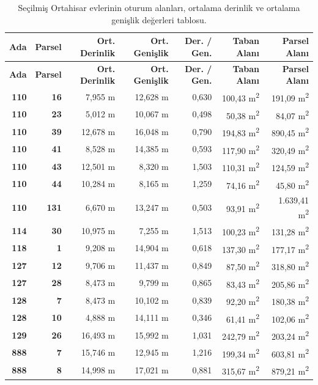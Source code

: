 \documentclass[12pt,turkish,a4paperpaper,]{report}
\begin{document}
\begin{longtable}[]{@{}rrrrrrr@{}}
\caption{Seçilmiş Ortahisar evlerinin oturum alanları, ortalama derinlik
ve ortalama genişlik değerleri tablosu.
\label{EvlerAlanlarOrtalamalar}}\tabularnewline
\toprule
\textbf{Ada} & \textbf{Parsel} & \textbf{Ort. Derinlik} & \textbf{Ort.
Genişlik} & \textbf{Der. / Gen.} & \textbf{Taban Alanı} & \textbf{Parsel
Alanı}\tabularnewline
\midrule
\endfirsthead
\toprule
\textbf{Ada} & \textbf{Parsel} & \textbf{Ort. Derinlik} & \textbf{Ort.
Genişlik} & \textbf{Der. / Gen.} & \textbf{Taban Alanı} & \textbf{Parsel
Alanı}\tabularnewline
\midrule
\endhead
\textbf{110} & \textbf{16} & 7,955 m & 12,628 m & 0,630 & 100,43
m\textsuperscript{2} & 191,09 m\textsuperscript{2}\tabularnewline
\textbf{110} & \textbf{23} & 5,012 m & 10,067 m & 0,498 & 50,38
m\textsuperscript{2} & 84,07 m\textsuperscript{2}\tabularnewline
\textbf{110} & \textbf{39} & 12,678 m & 16,048 m & 0,790 & 194,83
m\textsuperscript{2} & 890,45 m\textsuperscript{2}\tabularnewline
\textbf{110} & \textbf{41} & 8,528 m & 14,385 m & 0,593 & 117,90
m\textsuperscript{2} & 320,49 m\textsuperscript{2}\tabularnewline
\textbf{110} & \textbf{43} & 12,501 m & 8,320 m & 1,503 & 110,31
m\textsuperscript{2} & 124,59 m\textsuperscript{2}\tabularnewline
\textbf{110} & \textbf{44} & 10,284 m & 8,165 m & 1,259 & 74,16
m\textsuperscript{2} & 45,80 m\textsuperscript{2}\tabularnewline
\textbf{110} & \textbf{131} & 6,670 m & 13,247 m & 0,503 & 93,91
m\textsuperscript{2} & 1.639,41 m\textsuperscript{2}\tabularnewline
\textbf{114} & \textbf{30} & 10,975 m & 7,255 m & 1,513 & 100,23
m\textsuperscript{2} & 131,28 m\textsuperscript{2}\tabularnewline
\textbf{118} & \textbf{1} & 9,208 m & 14,904 m & 0,618 & 137,30
m\textsuperscript{2} & 177,17 m\textsuperscript{2}\tabularnewline
\textbf{127} & \textbf{12} & 9,706 m & 11,437 m & 0,849 & 87,50
m\textsuperscript{2} & 318,80 m\textsuperscript{2}\tabularnewline
\textbf{127} & \textbf{28} & 8,473 m & 9,799 m & 0,865 & 83,43
m\textsuperscript{2} & 205,86 m\textsuperscript{2}\tabularnewline
\textbf{128} & \textbf{7} & 8,473 m & 10,102 m & 0,839 & 92,20
m\textsuperscript{2} & 180,38 m\textsuperscript{2}\tabularnewline
\textbf{128} & \textbf{10} & 4,888 m & 14,111 m & 0,346 & 61,41
m\textsuperscript{2} & 102,06 m\textsuperscript{2}\tabularnewline
\textbf{129} & \textbf{26} & 16,493 m & 15,992 m & 1,031 & 242,79
m\textsuperscript{2} & 203,24 m\textsuperscript{2}\tabularnewline
\textbf{888} & \textbf{7} & 15,746 m & 12,945 m & 1,216 & 199,34
m\textsuperscript{2} & 603,81 m\textsuperscript{2}\tabularnewline
\textbf{888} & \textbf{8} & 14,998 m & 17,021 m & 0,881 & 315,67
m\textsuperscript{2} & 879,21 m\textsuperscript{2}\tabularnewline
\bottomrule
\end{longtable}
\end{document}
